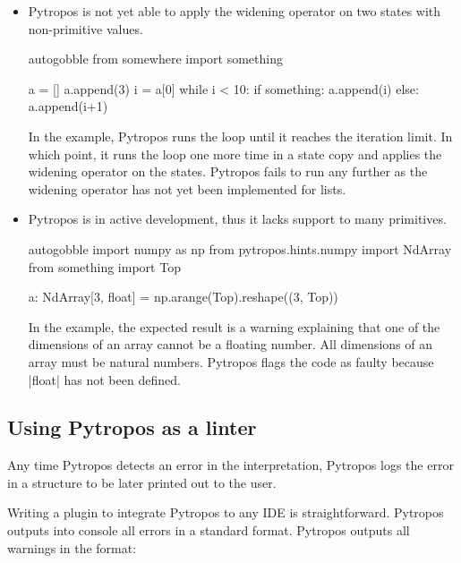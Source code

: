 \begin{itemize}
\item Pytropos is not yet able to apply the widening operator on two states with
  non-primitive values.

  \begin{pythoncode*}{autogobble}
     from somewhere import something

     a = []
     a.append(3)
     i = a[0]
     while i < 10:
         if something:
             a.append(i)
         else:
             a.append(i+1)
  \end{pythoncode*}

  In the example, Pytropos runs the loop until it reaches the iteration limit. In which
  point, it runs the loop one more time in a state copy and applies the widening operator
  on the states. Pytropos fails to run any further as the widening operator has not yet
  been implemented for lists.

\item Pytropos is in active development, thus it lacks support to many primitives.

  \begin{pythoncode*}{autogobble}
    import numpy as np
    from pytropos.hints.numpy import NdArray
    from something import Top

    a: NdArray[3, float] = np.arange(Top).reshape((3, Top))
  \end{pythoncode*}

  In the example, the expected result is a warning explaining that one of the dimensions
  of an array cannot be a floating number. All dimensions of an array must be natural
  numbers. Pytropos flags the code as faulty because \pycode|float| has not been defined.

\end{itemize}


\subsection{Using Pytropos as a linter}

Any time Pytropos detects an error in the interpretation, Pytropos logs the error in a
structure to be later printed out to the user.

Writing a plugin to integrate Pytropos to any IDE is straightforward. Pytropos outputs
into console all errors in a standard format. Pytropos outputs all warnings in the format:


